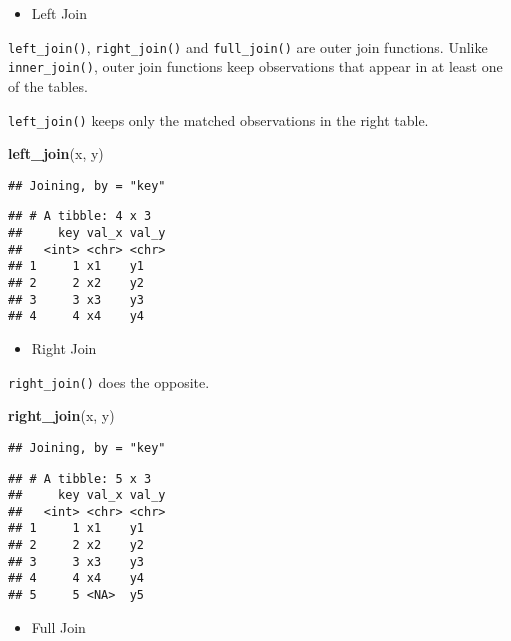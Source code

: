 \documentclass[
]{book}
\newenvironment{Shaded}{\begin{snugshade}}{\end{snugshade}}
\newcommand{\KeywordTok}[1]{\textcolor[rgb]{0.13,0.29,0.53}{\textbf{#1}}}
\newcommand{\NormalTok}[1]{#1}
\providecommand{\tightlist}{%
  \setlength{\itemsep}{0pt}\setlength{\parskip}{0pt}}
\begin{document}
\begin{itemize}
\tightlist
\item
  Left Join
\end{itemize}

\texttt{left\_join()}, \texttt{right\_join()} and \texttt{full\_join()} are outer join functions. Unlike \texttt{inner\_join()}, outer join functions keep observations that appear in at least one of the tables.

\texttt{left\_join()} keeps only the matched observations in the right table.

\begin{Shaded}
\begin{Highlighting}[]
\KeywordTok{left\_join}\NormalTok{(x, y)}
\end{Highlighting}
\end{Shaded}

\begin{verbatim}
## Joining, by = "key"
\end{verbatim}

\begin{verbatim}
## # A tibble: 4 x 3
##     key val_x val_y
##   <int> <chr> <chr>
## 1     1 x1    y1   
## 2     2 x2    y2   
## 3     3 x3    y3   
## 4     4 x4    y4
\end{verbatim}

\begin{itemize}
\tightlist
\item
  Right Join
\end{itemize}

\texttt{right\_join()} does the opposite.

\begin{Shaded}
\begin{Highlighting}[]
\KeywordTok{right\_join}\NormalTok{(x, y)}
\end{Highlighting}
\end{Shaded}

\begin{verbatim}
## Joining, by = "key"
\end{verbatim}

\begin{verbatim}
## # A tibble: 5 x 3
##     key val_x val_y
##   <int> <chr> <chr>
## 1     1 x1    y1   
## 2     2 x2    y2   
## 3     3 x3    y3   
## 4     4 x4    y4   
## 5     5 <NA>  y5
\end{verbatim}

\begin{itemize}
\tightlist
\item
  Full Join
\end{itemize}
\end{document}
